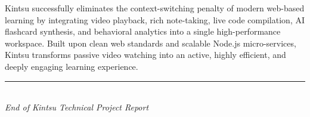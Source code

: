 \documentclass[12pt,a4paper]{article}
\begin{document}
\begin{center}
\begin{tcolorbox}[colback=featurebox, colframe=kintsuPink, arc=6pt, width=\textwidth, title={\bfseries\large Kintsu Project Summary in One Paragraph}]
\centering
\small
Kintsu successfully eliminates the context-switching penalty of modern web-based learning by integrating video playback, rich note-taking, live code compilation, AI flashcard synthesis, and behavioral analytics into a single high-performance workspace. Built upon clean web standards and scalable Node.js micro-services, Kintsu transforms passive video watching into an active, highly efficient, and deeply engaging learning experience.
\end{tcolorbox}
\end{center}

\vspace{0.4cm}
\begin{center}
  {\color{kintsuPink}\rule{8cm}{1pt}}\\[0.2cm]
  {\small\color{kintsuGray}\textit{End of Kintsu Technical Project Report}}
\end{center}
\end{document}
